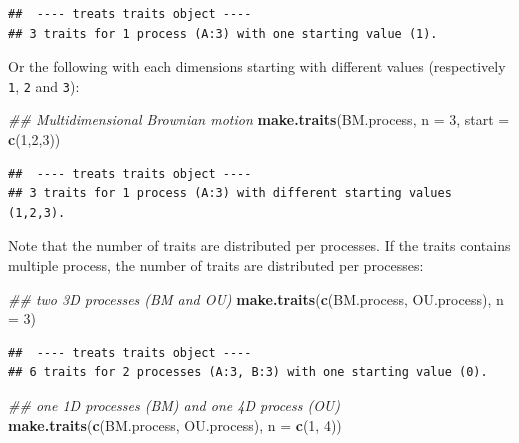 \documentclass[
]{book}
\newenvironment{Shaded}{\begin{snugshade}}{\end{snugshade}}
\newcommand{\CommentTok}[1]{\textcolor[rgb]{0.56,0.35,0.01}{\textit{#1}}}
\newcommand{\DataTypeTok}[1]{\textcolor[rgb]{0.13,0.29,0.53}{#1}}
\newcommand{\DecValTok}[1]{\textcolor[rgb]{0.00,0.00,0.81}{#1}}
\newcommand{\KeywordTok}[1]{\textcolor[rgb]{0.13,0.29,0.53}{\textbf{#1}}}
\newcommand{\NormalTok}[1]{#1}
\begin{document}
\begin{verbatim}
##  ---- treats traits object ---- 
## 3 traits for 1 process (A:3) with one starting value (1).
\end{verbatim}

Or the following with each dimensions starting with different values (respectively \texttt{1}, \texttt{2} and \texttt{3}):

\begin{Shaded}
\begin{Highlighting}[]
\CommentTok{\#\# Multidimensional Brownian motion}
\KeywordTok{make.traits}\NormalTok{(BM.process, }\DataTypeTok{n =} \DecValTok{3}\NormalTok{, }\DataTypeTok{start =} \KeywordTok{c}\NormalTok{(}\DecValTok{1}\NormalTok{,}\DecValTok{2}\NormalTok{,}\DecValTok{3}\NormalTok{))}
\end{Highlighting}
\end{Shaded}

\begin{verbatim}
##  ---- treats traits object ---- 
## 3 traits for 1 process (A:3) with different starting values (1,2,3).
\end{verbatim}

Note that the number of traits are distributed per processes.
If the traits contains multiple process, the number of traits are distributed per processes:

\begin{Shaded}
\begin{Highlighting}[]
\CommentTok{\#\# two 3D processes (BM and OU)}
\KeywordTok{make.traits}\NormalTok{(}\KeywordTok{c}\NormalTok{(BM.process, OU.process), }\DataTypeTok{n =} \DecValTok{3}\NormalTok{)}
\end{Highlighting}
\end{Shaded}

\begin{verbatim}
##  ---- treats traits object ---- 
## 6 traits for 2 processes (A:3, B:3) with one starting value (0).
\end{verbatim}

\begin{Shaded}
\begin{Highlighting}[]
\CommentTok{\#\# one 1D processes (BM) and one 4D process (OU)}
\KeywordTok{make.traits}\NormalTok{(}\KeywordTok{c}\NormalTok{(BM.process, OU.process), }\DataTypeTok{n =} \KeywordTok{c}\NormalTok{(}\DecValTok{1}\NormalTok{, }\DecValTok{4}\NormalTok{))}
\end{Highlighting}
\end{Shaded}
\end{document}
